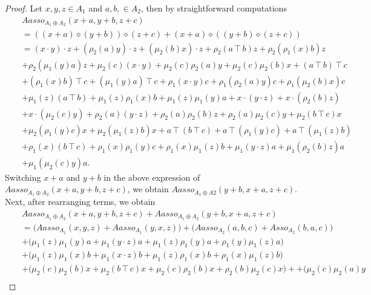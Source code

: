 \documentclass[10pt,a4paper]{amsart}
\begin{document}
	\begin{proof} Let $x,y,z\in A_1$ and $a,b,\in A_2$, then by straightforward computations
		\begin{eqnarray}
			&& Aasso_{A_1\oplus A_2}(x+a,y+b,z+c)\nonumber\\
			&&=((x+a)\diamond(y+b))\diamond(z+c)+
			(x+a)\diamond((y+b)\diamond(z+c))\nonumber\\
			&&=(x\cdot y)\cdot z+(\rho_2(a)y)\cdot z+(\mu_2(b)x)\cdot z+\rho_2(a\intercal b)z+\rho_2(\rho_1(x)b)z\nonumber\\
			&&+\rho_2(\mu_1(y)a)z+\mu_2(c)(x\cdot y)+\mu_2(c)\rho_2(a)y+\mu_2(c)\mu_2(b)x+(a\intercal b)\intercal c\nonumber\\
			&&+(\rho_1(x)b)\intercal c+(\mu_1(y)a)\intercal c+\rho_1(x\cdot y)c+\rho_1(\rho_2(a)y)c
			+\rho_1(\mu_2(b)x)c\nonumber\\
			&&+\mu_1(z)(a\intercal b)+\mu_1(z)\rho_1(x)b+\mu_1(z)\mu_1(y)a
			+x\cdot(y\cdot z)+x\cdot(\rho_2(b)z)\nonumber\\
			&&+x\cdot(\mu_2(c)y)+\rho_2(a)(y\cdot z)+\rho_2(a)\rho_2(b)z+\rho_2(a)\mu_2(c)y+\mu_2(b\intercal c)x\nonumber\\
			&&+\mu_2(\rho_1(y)c)x+\mu_2(\mu_1(z)b)x
			+a\intercal(b\intercal c)+a\intercal(\rho_1(y)c)
			+a\intercal(\mu_1(z)b)\nonumber\\
			&&+\rho_1(x)(b\intercal c)+\rho_1(x)\rho_1(y)c+\rho_1(x)\mu_1(z)b+\mu_1(y\cdot z)a+\mu_1(\rho_2(b)z)a\nonumber\\
			&&+\mu_1(\mu_2(c)y)a.\nonumber
		\end{eqnarray}
		Switching $x+a$ and $y+b$ in the above expression of $Aasso_{A_1\oplus A_2}(x+a,y+b,z+c)$, we obtain  $Aasso_{A_1\oplus A2}(y+b,x+a,z+c).$
		Next, after rearranging terms, we obtain
		\begin{eqnarray}
			&&Aasso_{A_1\oplus A_2}(x+a,y+b,z+c)+Aasso_{A_1\oplus A_2}(y+b,x+a,z+c)\nonumber\\
			&&
			=\Big(Aasso_{A_1}(x,y,z)+Aasso_{A_1}(y,x,z)\Big)
			+\Big(Aasso_{A_2}(a,b,c)+Asso_{A_2}(b,a,c)\Big)\nonumber\\
			&&+
			\Big(\mu_1(z)\mu_1(y)a+\mu_1(y\cdot z)a+\mu_1(z)\rho_1(y)a
			+\rho_1(y)\mu_1(z)a \Big)\nonumber\\
			&&+	\Big(\mu_1(z)\mu_1(x)b+\mu_1(x\cdot z)b+\mu_1(z)\rho_1(x)b+\rho_1(x)\mu_1(z)b \Big)\nonumber\\
			&&+\Big(\mu_2(c)\mu_2(b)x+\mu_2(b\intercal c)x+\mu_2(c)\rho_2(b)x+\rho_2(b)\mu_2(c)x \Big)+
			+\Big(\mu_2(c)\mu_2(a)y\nonumber\\

\end{eqnarray}
\end{proof}
\end{document}
